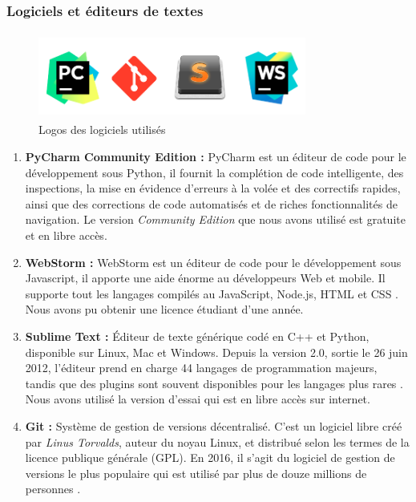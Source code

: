         \subsubsection{Logiciels et éditeurs de textes}
            \begin{figure}[H]
                    \centering
                    \includegraphics[height=80pt,width=250pt]{img/chapter4/tools/software.png}
                    \caption{Logos des logiciels utilisés}
                    \label{}
            \end{figure}
            \begin{enumerate}
                \item{\textbf{PyCharm Community Edition : }}
                PyCharm est un éditeur de code pour le développement sous Python, il fournit la complétion de code intelligente, des inspections, la mise en évidence d'erreurs à la volée et des correctifs rapides, ainsi que des corrections de code automatisés et de riches fonctionnalités de navigation.\cite{pycharm} Le version \emph{Community Edition} que nous avons utilisé est gratuite et en libre accès.\\

                \item{\textbf{WebStorm : }}
                WebStorm est un éditeur de code pour le développement sous Javascript, il apporte une aide énorme au développeurs Web et mobile. Il supporte tout les langages compilés au JavaScript, Node.js, HTML et CSS \cite{webstorm}. Nous avons pu obtenir une licence étudiant d'une année.\\

                \item{\textbf{Sublime Text : }}
                Éditeur de texte générique codé en C++ et Python, disponible sur Linux, Mac et Windows. Depuis la version 2.0, sortie le 26 juin 2012, l'éditeur prend en charge 44 langages de programmation majeurs, tandis que des plugins sont souvent disponibles pour les langages plus rares \cite{sublime}. Nous avons utilisé la version d’essai qui est en libre accès sur internet.\\

                \item{\textbf{Git : }}
                Système de gestion de versions décentralisé. C'est un logiciel libre créé par \emph{Linus Torvalds}, auteur du noyau Linux, et distribué selon les termes de la licence publique générale (GPL). En 2016, il s’agit du logiciel de gestion de versions le plus populaire qui est utilisé par plus de douze millions de personnes \cite{git}.
            \end{enumerate}


